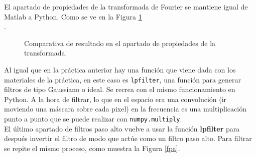 El apartado de propiedades de la transformada de Fourier se mantiene igual de Matlab a Python. Como se ve en la Figura \ref{zoom}\\.

\begin{figure}[!tbp]
  \centering
  \hfill
  \caption{Comparativa de resultado en el apartado de propiedades de la transformada.}
  \label{zoom}
\end{figure}

Al igual que en la práctica anterior hay una función que viene dada con los materiales de la práctica, en este caso es  \texttt{lpfilter}, una función para generar filtros de tipo Gaussiano o ideal. Se recrea con el mismo funcionamiento en Python. A la hora de filtrar, lo que en el espacio era una convolución (ir moviendo una máscara sobre cada pixel) en la frecuencia es una multiplicación punto a punto que se puede realizar con \texttt{numpy.multiply}.\\

El último apartado de filtros paso alto vuelve a usar la función \textbf{lpfilter} para después invertir el filtro de modo que actúe como un filtro paso alto. Para filtrar se repite el mismo proceso, como muestra la Figura \ref{fpa}.

